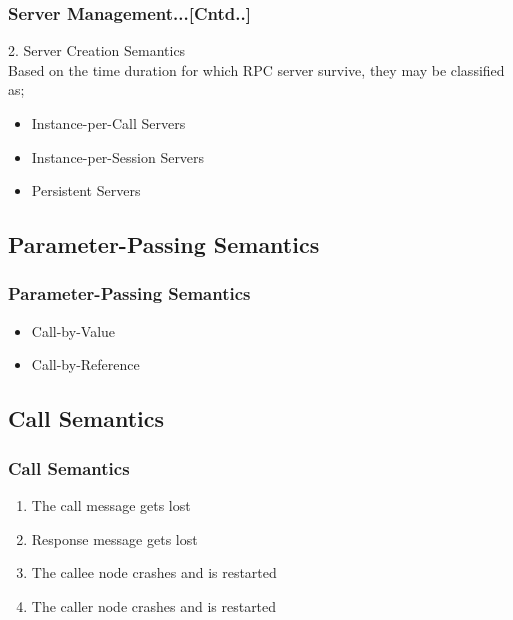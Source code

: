 \documentclass{beamer}
\begin{document}
\begin{frame}
	\frametitle{Server Management...[Cntd..]}
	\vspace{0.3cm}
	2. Server Creation Semantics\\
	\vspace{0.3cm}
	Based on the time duration for which RPC server survive, they may be classified as;
	\vspace{0.3cm}
	\begin{itemize}
		\item Instance-per-Call Servers
		\item Instance-per-Session Servers
		\item Persistent Servers
	\end{itemize}
		
	\vspace{5cm}
\end{frame}

\subsection{Parameter-Passing Semantics}
\begin{frame}
	\frametitle{Parameter-Passing Semantics}
	\vspace{0.3cm}
	\vspace{0.3cm}
	\begin{itemize}
		\item Call-by-Value
		\item Call-by-Reference
	\end{itemize}
		
	\vspace{5cm}
\end{frame}


\subsection{Call Semantics}
\begin{frame}
	\frametitle{Call Semantics}
	\vspace{0.3cm}
	\vspace{0.3cm}
	\begin{enumerate}
		\item The call message gets lost
		\item Response message gets lost
		\item The callee node crashes and is restarted
		\item The caller node crashes and is restarted
	\end{enumerate}		
	\vspace{5cm}
\end{frame}
\end{document}
